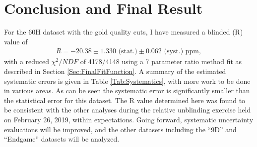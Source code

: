 \chapter{Conclusion and Final Result}
\label{Ch:Conclusion}


For the 60H dataset with the gold quality cuts, I have measured a blinded \wa (R) value of
	\begin{gather}
		R = -20.38 \pm 1.330 \text{ (stat.)} \pm 0.062 \text{ (syst.) ppm},
	\end{gather}
with a reduced $\chi^{2}/NDF$ of 4178/4148 using a 7 parameter ratio method fit as described in Section \ref{Sec:FinalFitFunction}. A summary of the estimated systematic errors is given in Table \ref{Tab:Systematics}, with more work to be done in various areas. As can be seen the systematic error is significantly smaller than the statistical error for this dataset. The R value determined here was found to be consistent with the other analyses during the relative unblinding exercise held on February 26, 2019, within expectations. Going forward, systematic uncertainty evaluations will be improved, and the other datasets including the ``9D'' and ``Endgame'' datasets will be analyzed.


